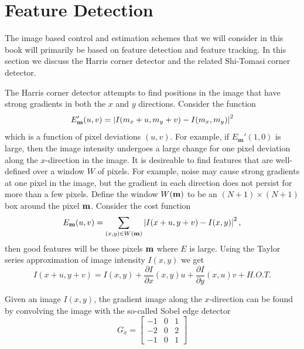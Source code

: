\section{Feature Detection}
\label{sec:feature_detection}


The image based control and estimation schemes that we will consider in this book will primarily be based on feature detection and feature tracking.  In this section we discuss the Harris corner detector and the related Shi-Tomasi corner detector. 
%
	
The Harris corner detector attempts to find positions in the image that have strong gradients in both the $x$ and $y$ directions. Consider the function
\[
E_{\mathbf{m}}'(u,v) = \left|I(m_x + u, m_y+v) - I(m_x, m_y)\right|^2
\]
which is a function of pixel deviations $(u,v)$.  For example, if $E_{\mathbf{m}}'(1,0)$ is large, then the image intensity undergoes a large change for one pixel deviation along the $x$-direction in the image.  
It is desireable to find features that are well-defined over a window $W$ of pixels.  For example, noise may cause strong gradients at one pixel in the image, but the gradient in each direction does not persist for more than a few pixels.  Define the window $W(\mathbf{m})$ to be an $(N+1)\times(N+1)$ box around the pixel $\mathbf{m}$.  Consider the cost function
\[
E_{\mathbf{m}}(u,v) = \sum_{(x,y)\in W(\mathbf{m})} \left| I(x+u, y+v)-I(x,y) \right|^2,
\]
then good features will be those pixels $\mathbf{m}$ where $E$ is large.
Using the Taylor series approximation of image intensity $I(x,y)$ we get
\begin{equation}\label{eq:image_gradient_1}
I(x+u, y+v) = I(x,y) + \frac{\partial I}{\partial x}(x,y)u + \frac{\partial I}{\partial y}(x,u) v + H.O.T.
\end{equation}

Given an image $I(x, y)$, the gradient image along the $x$-direction can be found by convolving the image with the so-called Sobel edge detector
\[
G_x = \left[ \begin{array}{c|c|c}
-1 & 0 & 1 \\\hline -2 & 0 & 2 \\\hline -1 & 0 & 1
\end{array} \right]
\]

